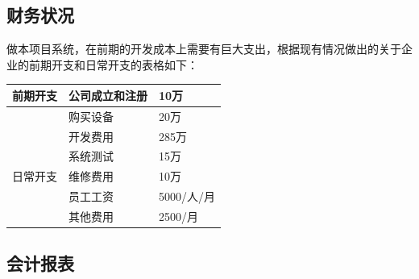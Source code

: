 \documentclass[UTF8]{ctexart}
\begin{document}
\subsection{财务状况}
做本项目系统，在前期的开发成本上需要有巨大支出，根据现有情况做出的关于企业的前期开支和日常开支的表格如下：
\begin{table}[H]
	\centering
	\begin{tabular}{|l|l|l|}
		\hline
		前期开支 & 公司成立和注册 & 10万       \\ \hline
		         & 购买设备       & 20万       \\ \hline
		         & 开发费用       & 285万      \\ \hline
		         & 系统测试       & 15万       \\ \hline
		日常开支 & 维修费用       & 10万       \\ \hline
		         & 员工工资       & 5000/人/月 \\ \hline
		         & 其他费用       & 2500/月    \\ \hline
	\end{tabular}
\end{table}
\subsection{会计报表}
\end{document}
